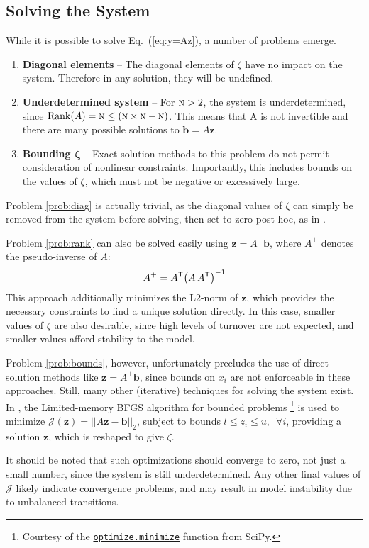 \documentclass{article}
\newcommand{\N}{\textsc{n}}
\begin{document}
\subsection{Solving the System}
While it is possible to solve Eq.~(\ref{eq:y=Az}), a number of problems emerge.
\begin{enumerate}
  \item \textbf{Diagonal elements}\label{prob:diag} --
  The diagonal elements of $\zeta$ have no impact on the system.
  Therefore in any solution, they will be undefined.
  \item \textbf{Underdetermined system}\label{prob:rank} --
  For $\N > 2$, the system is underdetermined,
  since $\mathrm{Rank}(A) = \N \le (\N\times\N - \N)$.
  This means that A is not invertible and
  there are many possible solutions to $\bm{b} = A\bm{z}$.
  \item \textbf{Bounding $\bm{\zeta}$}\label{prob:bounds} --
  Exact solution methods to this problem do not permit consideration of nonlinear constraints.
  Importantly, this includes bounds on the values of $\zeta$,
  which must not be negative or excessively large.
\end{enumerate}
Problem \ref{prob:diag} is actually trivial,
as the diagonal values of $\zeta$ can simply be
removed from the system before solving, then set to zero post-hoc,
as in .
\par
Problem \ref{prob:rank} can also be solved easily using $\bm{z} = A^{+}\bm{b}$,
where $A^{+}$ denotes the pseudo-inverse of $A$:
\begin{equation}
A^{+} = A^{\mathsf{T}}{\left(A \thinspace A^{\mathsf{T}}\right)}^{-1}
\end{equation}
This approach additionally minimizes the L2-norm of $\bm{z}$,
which provides the necessary constraints to find a unique solution directly.
In this case, smaller values of $\zeta$ are also desirable,
since high levels of turnover are not expected,
and smaller values afford stability to the model.
\par
Problem \ref{prob:bounds}, however, unfortunately precludes the use of
direct solution methods like $\bm{z} = A^{+}\bm{b}$,
since bounds on $x_i$ are not enforceable in these approaches.
Still, many other (iterative) techniques for solving the system exist.
In , the Limited-memory BFGS algorithm for bounded problems%
\footnote{Courtesy of the
  \href{https://docs.scipy.org/doc/scipy-1.0.0/reference/generated/scipy.optimize.minimize.html}%
       {\texttt{optimize.minimize}}
  function from SciPy.}
is used to minimize $\mathcal{J}(\bm{z}) = {\left|\left| A\bm{z} - \bm{b} \right|\right|}_2$,
subject to bounds $l \le z_i \le u, \enspace\forall i$,
providing a solution $\bm{z}$, which is reshaped to give $\zeta$.
\par
It should be noted that such optimizations should converge to zero, not just a small number,
since the system is still underdetermined.
Any other final values of $\mathcal{J}$ likely indicate convergence problems,
and may result in model instability due to unbalanced transitions.
\end{document}
